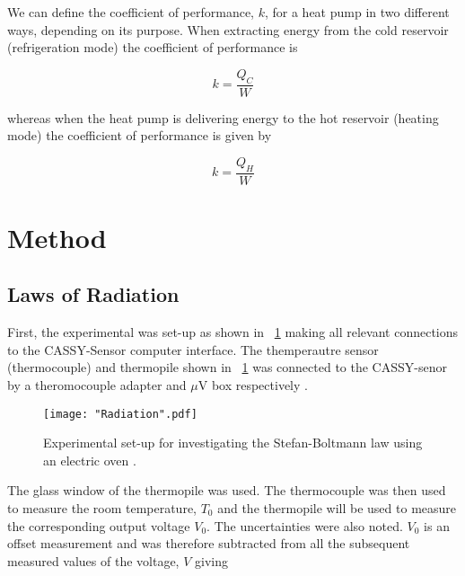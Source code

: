 \documentclass{article}
\newcommand{\figref}[2][\figurename~]{#1\ref{#2}}
\begin{document}
\vspace{2mm}
\noindent
We can define the coefficient of performance, $k$, for a heat pump in two different ways, depending on its purpose. When extracting energy from the cold reservoir (refrigeration mode) the coefficient of performance is

\begin{equation}
\label{eq:Rerigeration}
k = \frac{Q_C}{W}
\end{equation}

\vspace{2mm}
\noindent
whereas when the heat pump is delivering energy to the hot reservoir (heating mode) the coefficient of performance is given by

\begin{equation}
\label{eq:Heating}
k = \frac{Q_H}{W}
\end{equation}

 
\section{Method}
\label{sec:method}

\subsection{Laws of Radiation}
\label{ssec:radiaton-method}

First, the experimental was set-up as shown in \figref{fig:radiation} \cite{Paper01} making all relevant connections to the CASSY-Sensor computer interface. The themperautre sensor (thermocouple) and thermopile shown in \figref{fig:radiation} was connected to the CASSY-senor by a theromocouple adapter and $\mu$V box respectively \cite{Paper01}. 

\begin{figure}[h]
\centering
\texttt{[image: "Radiation".pdf]}
\caption{Experimental set-up for investigating the Stefan-Boltmann law using an electric oven \cite{Paper01}.}
\label{fig:radiation}
\end{figure}

\vspace{2mm}
\noindent
The glass window of the thermopile was used. The thermocouple was then used to measure the room temperature, $T_0$ and the thermopile will be used to measure the corresponding output voltage $V_0$. The uncertainties were also noted. $V_0$ is an offset measurement and was therefore subtracted from all the subsequent measured values of the voltage, $V$ \cite{Paper01} giving
\end{document}
